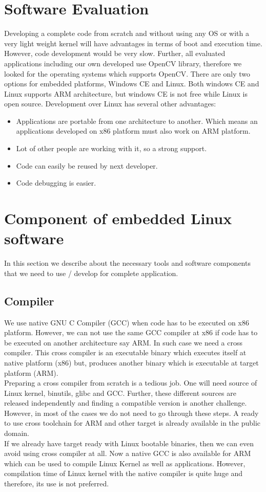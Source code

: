 \section {Software Evaluation}
\indent Developing a complete code from scratch and without using any OS
or with a very light weight kernel will have advantages in terms of boot
and execution time. However, code development would be very slow. Further,
all evaluated applications including our own developed use
OpenCV library, therefore we looked for the operating systems which
supports OpenCV. There are only two options for embedded platforms,
Windows CE and Linux. Both windows CE and Linux supports ARM
architecture, but windows CE is not free while Linux is open source.
Development over Linux has several other advantages:
\begin{itemize}
 \item Applications are portable from one architecture to
 another. Which means an applications developed on x86
 platform must also work on ARM platform.
 \item Lot of other people are working with it, so a strong
 support.
 \item Code can easily be reused by next developer.
 \item Code debugging is easier.
\end{itemize}
\section {Component of embedded Linux software}
In this section we describe about the necessary tools and software
components that we need to use / develop for complete application.
\subsection {Compiler}
\indent We use native GNU C Compiler (GCC) when code has to be executed
on x86 platform. However, we can not use the same GCC compiler at x86 if
code has to be executed on another architecture say ARM. In such case we
need a cross compiler. This cross compiler is an executable binary which
executes itself at native platform (x86) but, produces another
binary which is executable at target platform (ARM).\\
\indent Preparing a cross compiler from scratch is a tedious job. One
will need source of Linux kernel, binutils, glibc and GCC. Further,
these different sources are released independently and finding a
compatible version is another challenge. However, in most of the cases
we do not need to go through these steps. A ready to use cross toolchain
for ARM and other target is already available in the public domain.\\
\indent If we already have target ready with Linux bootable binaries,
then we can even avoid using cross compiler at all. Now a native GCC is
also available for ARM which can be used to compile Linux Kernel as well
as applications. However, compilation time of Linux kernel with the
native compiler is quite huge and therefore, its use is not preferred.
